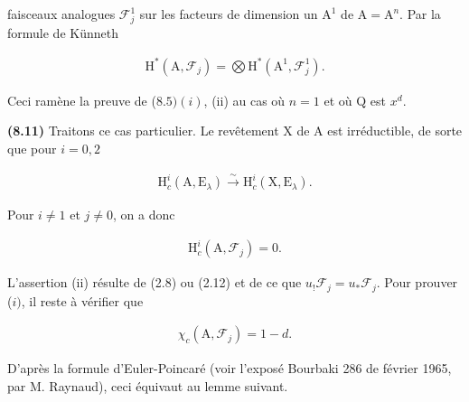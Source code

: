\documentclass[10pt,leqno]{article}
\begin{document}
\noindent faisceaux analogues \(\mathcal{F} _{j}^{1}\) sur les facteurs de dimension un \(\mathrm{A}^{1}\) de \(\mathrm{A} = \mathrm{A}^{n}\). Par la formule de Künneth\par

\begin{equation*}\begin{gathered}\mathrm{H}^{*}(\mathrm{A},\mathcal{F} _{j}) = \bigotimes \mathrm{H}^{*}(\mathrm{A}^{1},\mathcal{F} _{j}^{1}).\end{gathered}\end{equation*}

\noindent Ceci ramène la preuve de (\(8.5) (i)\), (ii) au cas où \(n = 1\) et où \(\mathrm{Q}\) est \(x^{d}\).\par

\noindent \textbf{(8.11)} Traitons ce cas particulier. Le revêtement \(\mathrm{X}\) de \(\mathrm{A}\) est irréductible, de sorte que pour \(i = 0,2\)\par

\begin{equation*}\begin{gathered}\mathrm{H}_{c}^{i}(\mathrm{A},\mathrm{E}_{\lambda }) \xrightarrow{\sim } \mathrm{H}_{c}^{i}(\mathrm{X},\mathrm{E}_{\lambda }).\end{gathered}\end{equation*}

\noindent Pour \(i \ne  1\) et \(j \ne  0\), on a donc\par

\begin{equation*}\begin{gathered}\mathrm{H}_{c}^{i}(\mathrm{A},\mathcal{F} _{j}) = 0.\end{gathered}\end{equation*}

\noindent L'assertion (ii) résulte de (2.8) ou (2.12) et de ce que \(u_{!}\mathcal{F} _{j} = u_{*}\mathcal{F} _{j}\). Pour prouver (\(i)\), il reste à vérifier que\par

\begin{equation*}\begin{gathered}\chi _{c}(\mathrm{A},\mathcal{F} _{j}) = 1-d.\end{gathered}\end{equation*}

\noindent D'après la formule d'Euler-Poincaré (voir l'exposé Bourbaki 286 de février 1965, par \(\mathrm{M}\). Raynaud), ceci équivaut au lemme suivant.\par
\end{document}
